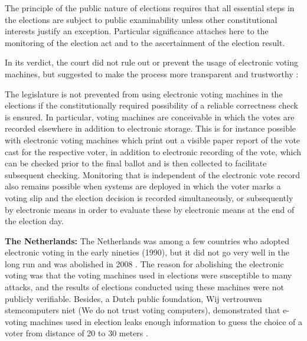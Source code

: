   \begin{displayquote}
  The principle of the public nature of elections requires that all 
  essential steps in the elections are subject to public examinability
  unless other constitutional interests justify an exception. 
  Particular significance attaches here to the monitoring of the 
  election act and to the ascertainment of the election result.
  \end{displayquote}
  
 
 
  \noindent	
  In its verdict, the court did not rule out or prevent the usage of electronic 
  voting machines,  but suggested to make the process more 
  transparent and trustworthy \citep{Germanconst}:
  
  \begin{displayquote}
  The legislature is not prevented from using electronic voting machines 
  in the elections if the constitutionally required possibility of a 
  reliable correctness check is ensured. In particular, voting machines 
  are conceivable in which the votes are recorded elsewhere in addition
   to electronic storage. This is for instance possible with electronic
   voting machines which print out a visible paper report of the vote 
   cast for the respective voter, in addition to electronic recording 
   of the vote, which can be checked prior to the final ballot and is
    then collected to facilitate subsequent checking. Monitoring that is
     independent of the electronic vote record also remains possible when
     systems are deployed in which the voter marks a voting slip and the 
     election decision is recorded simultaneously, 
     or subsequently by electronic means in 
     order to evaluate these by electronic means at the end of the 
     election day.
     \end{displayquote}
  
  \textbf{The Netherlands:}
  The Netherlands was among a few countries who adopted electronic voting 
  in the early nineties (1990), but it did not go very well in the long 
  run and was abolished in 2008 \citep{Jacobs2009}. 
  The reason for abolishing the electronic voting was that   
  the voting machines used in elections were susceptible to many attacks,
  and the results of elections conducted using these machines 
  were not publicly verifiable.  Besides, a Dutch public foundation, Wij vertrouwen stemcomputers niet
  (We do not trust voting computers), demonstrated that e-voting machines 
  used in election leaks enough information to guess the choice of a voter 
  from distance of 20 to 30 meters  \citep{NetherlandsYouTube}. 
  
